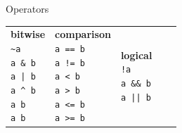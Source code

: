 \begin{frame}{Operators}
{\begin{tabular}{lllll}
            \specialcell{\textbf{bitwise}        \\
                \texttt{\textasciitilde{a}}      \\
                \texttt{a \& b}                  \\
                \texttt{a | b}                   \\
                \texttt{a \textasciicircum{ b}}  \\
                \texttt{a \lsh{} b}              \\
                \texttt{a \rsh{} b}              \\
            } &
            \specialcell{\textbf{comparison}    \\
                \texttt{a == b}                  \\
                \texttt{a != b}                  \\
                \texttt{a < b}                   \\
                \texttt{a > b}                   \\
                \texttt{a <= b}                  \\
                \texttt{a >= b}                  \\
            } &
            \specialcell{\textbf{logical}        \\
                \texttt{!a}                      \\
                \texttt{a \&\& b}                \\
                \texttt{a || b}                  \\
            } \\
        \end{tabular}
    }
\end{frame}

